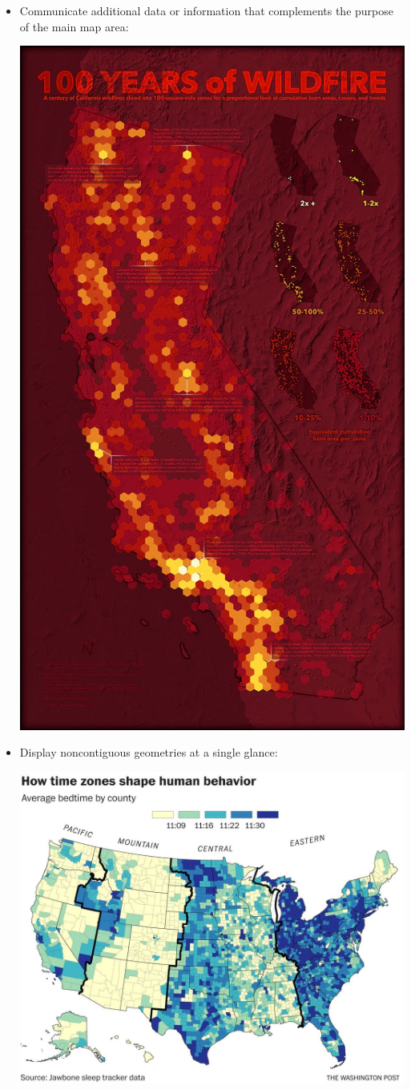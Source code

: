 \documentclass[oneside,a4paper,11pt,explicit]{book}
\begin{document}
\begin{tcolorbox}[enhanced jigsaw,breakable,pad at break*=1mm,
  colback=yellow!5!white,colframe=IceCreamLeaf,title=Inset Maps]
\begin{itemize}
         \item Communicate additional data or information that complements the purpose of the main map area:

         \vspace{.25em}

         \centerline{\includegraphics[width=.5\textwidth]{inset-multiples.jpg}}

         \item Display noncontiguous geometries at a single glance:

         \vspace{.25em}

         \centerline{\includegraphics[width=.65\textwidth]{inset-noncontiguous.jpg}}
    \end{itemize}
\end{tcolorbox}
\end{document}

